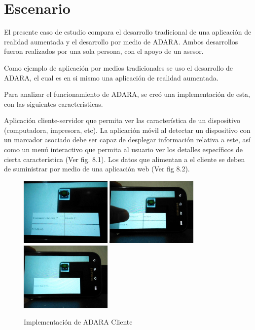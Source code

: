 \documentclass[12pt,a4paper,spanish,openany]{book}
\begin{document}
\section{Escenario}
El presente caso de estudio compara el desarrollo tradicional de una aplicación
de realidad aumentada y el desarrollo por medio de ADARA. Ambos desarrollos
fueron realizados por una sola persona, con el apoyo de un asesor.

Como ejemplo de aplicación por medios tradicionales se uso el desarrollo de
ADARA, el cual es en si mismo una aplicación de realidad aumentada.

Para analizar el funcionamiento de ADARA, se creó una implementación de esta,
con las siguientes características.

Aplicación cliente-servidor que permita ver las característica de un
dispositivo (computadora, impresora, etc). La
aplicación móvil al detectar un dispositivo con un marcador asociado debe ser
capaz de desplegar información relativa a este, así como un menú interactivo que
permita al usuario ver los detalles específicos de cierta característica (Ver
fig. 8.1). Los datos que alimentan a el cliente se deben de suministrar por
medio de una aplicación web (Ver fig 8.2).


\begin{figure}
\begin{center}
\includegraphics[width=0.4\textwidth]{./img/cliente1.jpg}
\includegraphics[width=0.4\textwidth]{./img/cliente3.jpg}
\includegraphics[width=0.4\textwidth]{./img/cliente4.jpg}
\caption{Implementación de ADARA Cliente}
\end{center}
\end{figure}
\end{document}
